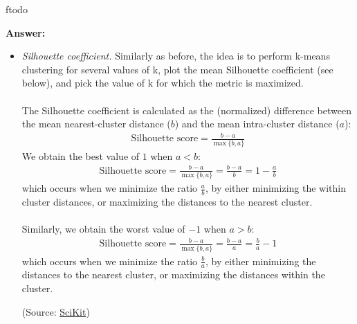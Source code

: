 ƒtodo\documentclass{article}
\newenvironment{QandA}{\begin{enumerate}[label=\arabic*.]}{\end{enumerate}}
\newenvironment{InnerQandA}{\begin{enumerate}[label=\roman*.]}{\end{enumerate}}
\newenvironment{answer}{\par\normalfont \textbf{Answer:}}{}
\begin{document}
\begin{QandA}
\begin{InnerQandA}
\begin{answer}
\begin{itemize}
                \item \textit{Silhouette coefficient.} Similarly as before, the idea is to perform k-means clustering for several values of k, plot the mean Silhouette coefficient (see below), and pick the value of k for which the metric is maximized. \\\\
                The Silhouette coefficient is calculated as the (normalized) difference between the mean nearest-cluster distance ($b$) and the mean intra-cluster distance ($a$):
                \begin{align*}
                    \text{Silhouette score} = \frac{b-a}{\max\{b, a\}}
                \end{align*}
                We obtain the best value of $1$ when $a < b$:
                \begin{align*}
                    \text{Silhouette score} = \frac{b-a}{\max\{b, a\}} = \frac{b-a}{b} = 1 - \frac{a}{b}
                \end{align*}
                which occurs when we minimize the ratio $\frac{a}{b}$, by either minimizing the within cluster distances, or maximizing the distances to the nearest cluster. \\\\
                Similarly, we obtain the worst value of $-1$ when $a > b$:
                \begin{align*}
                    \text{Silhouette score} = \frac{b-a}{\max\{b, a\}} = \frac{b-a}{a} = \frac{b}{a}-1
                \end{align*}
                which occurs when we minimize the ratio $\frac{b}{a}$, by either minimizing the distances to the nearest cluster, or maximizing the distances within the cluster.

                (Source: \href{https://scikit-learn.org/stable/modules/generated/sklearn.metrics.silhouette_score.html}{SciKit})
            \end{itemize}
        \end{answer}


\end{InnerQandA}
\end{QandA}
\end{document}
